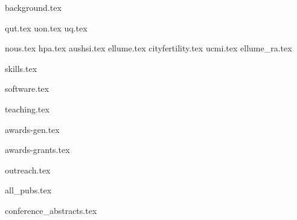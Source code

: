 \documentclass[11pt]{article}
\begin{document}
{background.tex}

{qut.tex}
{uon.tex}
{uq.tex}

\vspace{1mm}
{nous.tex}
{hpa.tex}
{aushsi.tex}
{ellume.tex}
{cityfertility.tex}
{ucmi.tex}
{ellume_ra.tex}

\vspace{1mm}
{skills.tex}

\vspace{1mm}
{software.tex}

\vspace{1mm}
{teaching.tex}

\vspace{1mm}
{awards-gen.tex}

\vspace{1mm}
{awards-grants.tex}

\vspace{1mm}
{outreach.tex}

\vspace{1mm}
\begin{enumerate}
	{all_pubs.tex}
\end{enumerate}\par

\vspace{1mm}
{conference_abstracts.tex}
\end{document}
